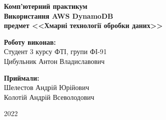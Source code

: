 \begin{titlepage}
    \vspace{15em}
    
    \begin{center}
        \begin{spacing}{1.5}
            \textbf{\Large{Комп'ютерний практикум }} \\
            \textbf{\Large{Використання AWS DynamoDB}} \\ 
            \vspace{1cm}\textbf{\large{предмет <<Хмарні технології обробки даних>>}}
        \end{spacing}
    \end{center}

    \vspace{15em}

    \newlength{\maxname}

    \hfill\parbox{\maxname}{
        \begin{spacing}{1.1}
            \small{\textbf{Роботу виконав:}} \\ 
            \small{Студент 3 курсу ФТІ, групи ФІ-91} \\
            \small{Цибульник Антон Владиславович} \\
        \end{spacing}
    }
         
    \hfill\parbox{\maxname}{
        \begin{spacing}{1.1}
            \small{\textbf{Приймали:}} \\ 
            \small{Шелестов Андрій Юрійович} \\
            \small{Колотій Андрій Всеволодович} \\
        \end{spacing}
    }

    \vspace{\fill}
    
    \begin{center}
        \small{2022}
    \end{center}
    
\end{titlepage}